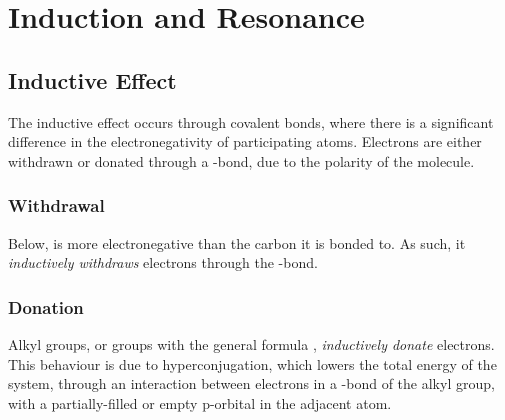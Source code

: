 

\pagebreak
\section{Induction and Resonance}

\subsection{Inductive Effect}

	The inductive effect occurs through covalent bonds, where there is a significant difference in the electronegativity of
	participating atoms. Electrons are either withdrawn or donated through a \chemsigma-bond, due to the polarity of the molecule.

	\subsubsection{Withdrawal}

		Below, \ch{\chlorine} is more electronegative than the carbon it is bonded to. As such, it
		\textit{inductively withdraws} electrons through the \chemsigma-bond.




	\subsubsection{Donation}

		Alkyl groups, or groups with the general formula , \textit{inductively donate} electrons. This behaviour
		is due to hyperconjugation, which lowers the total energy of the system, through an interaction between electrons in a
		\chemsigma-bond of the alkyl group, with a partially-filled or empty p-orbital in the adjacent atom.






